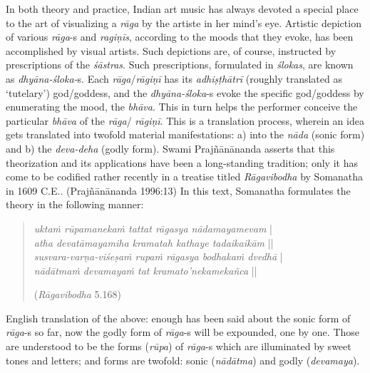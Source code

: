 In both theory and practice, Indian art music has always devoted a special place to the art of visualizing a \textsl{rāga} by the artiste in her mind’s eye. Artistic depiction of various \textsl{rāga}-s and \textsl{ragiṇīs}, according to the moods that they evoke, has been accomplished by visual artists. Such depictions are, of course, instructed by prescriptions of the \textsl{śāstras}. Such prescriptions, formulated in \textsl{ślokas}, are known as \textsl{dhyāna-śloka-}s. Each \textsl{rāga}/\textsl{rāgiṇī} has its \textsl{adhiṣṭhātrī} (roughly translated as ‘tutelary’) god/goddess, and the \textsl{dhyāna-śloka}-s evoke the specific god/goddess by enumerating the mood, the \textsl{bhāva}. This in turn helps the performer conceive the particular \textsl{bhāva} of the \textsl{rāga}/ \textsl{rāgiṇī}. This is a translation process, wherein an idea gets translated into twofold material manifestations: a) into the \textsl{nāda} (sonic form) and b) the \textsl{deva-deha} (godly form). Swami Prajñānānanda asserts that this theorization and its applications have been a long-standing tradition; only it has come to be codified rather recently in a treatise titled \textsl{Rāgavibodha} by Somanatha in 1609 C.E.. (Prajñānānanda 1996:13) In this text, Somanatha formulates the theory in the following manner:
\begin{quote}
\textsl{uktaṁ rūpamanekaṁ tattat rāgasya nādamayamevam} |\\
\textsl{atha devatāmayamiha kramatah kathaye tadaikaikām} ||\\
\textsl{susvara-varṇa-viśeṣaṁ rupaṁ rāgasya bodhakaṁ dvedhā} |\\
\textsl{nādātmaṁ devamayaṁ tat kramato’nekamekañca} || 

\hfill (\textsl{Rāgavibodha} 5.168)
\end{quote}

English translation of the above: enough has been said about the sonic form of \textsl{rāga}-s so far, now the godly form of \textsl{rāga}-s will be expounded, one by one. Those are understood to be the forms (\textsl{rūpa}) of \textsl{rāga}-s which are illuminated by sweet tones and letters; and forms are twofold: sonic (\textsl{nādātma}) and godly (\textsl{devamaya}). 

